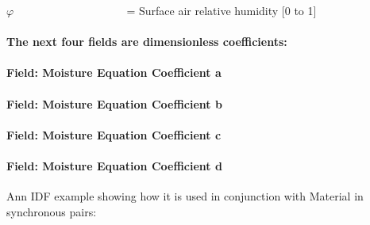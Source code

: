 \(\varphi\) ~~~~~~~~~~~~~~~~~~~ = Surface air relative humidity {[}0 to 1{]}

\paragraph{The next four fields are dimensionless coefficients:}\label{the-next-four-fields-are-dimensionless-coefficients}

\paragraph{Field: Moisture Equation Coefficient a}\label{field-moisture-equation-coefficient-a}

\paragraph{Field: Moisture Equation Coefficient b}\label{field-moisture-equation-coefficient-b}

\paragraph{Field: Moisture Equation Coefficient c}\label{field-moisture-equation-coefficient-c}

\paragraph{Field: Moisture Equation Coefficient d}\label{field-moisture-equation-coefficient-d}

Ann IDF example showing how it is used in conjunction with Material in synchronous pairs:

